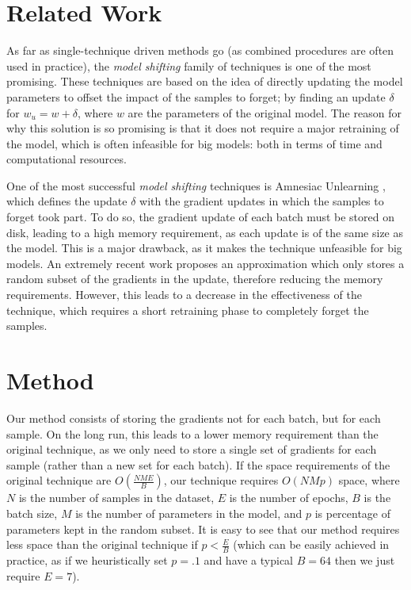 \documentclass{article}
\begin{document}
\section{Related Work}
As far as single-technique driven methods go (as combined procedures are often used in practice), the \emph{model shifting} \cite{xu2023survey} family of techniques is one of the most promising. These techniques are based on the idea of directly updating the model parameters to offset the impact of the samples to forget; by finding an update $\delta$ for $w_u=w+\delta$, where $w$ are the parameters of the original model. The reason for why this solution is so promising is that it does not require a major retraining of the model, which is often infeasible for big models: both in terms of time and computational resources.

One of the most successful \emph{model shifting} techniques is Amnesiac Unlearning \cite{graves2021amnesiac}, which defines the update $\delta$ with the gradient updates in which the samples to forget took part. To do so, the gradient update of each batch must be stored on disk, leading to a high memory requirement, as each update is of the same size as the model. This is a major drawback, as it makes the technique unfeasible for big models.
An extremely recent work \cite{gogineni2024efficient} proposes an approximation which only stores a random subset of the gradients in the update, therefore reducing the memory requirements. However, this leads to a decrease in the effectiveness of the technique, which requires a short retraining phase to completely forget the samples.

\section{Method}
Our method consists of storing the gradients not for each batch, but for each sample. On the long run, this leads to a lower memory requirement than the original technique, as we only need to store a single set of gradients for each sample (rather than a new set for each batch). If the space requirements of the original technique are $O(\frac{NME}{B})$, our technique requires $O(NMp)$ space, where $N$ is the number of samples in the dataset, $E$ is the number of epochs, $B$ is the batch size, $M$ is the number of parameters in the model, and $p$ is percentage of parameters kept in the random subset. It is easy to see that our method requires less space than the original technique if $p<\frac{E}{B}$ (which can be easily achieved in practice, as if we heuristically set $p=.1$ and have a typical $B=64$ then we just require $E=7$).
\end{document}
